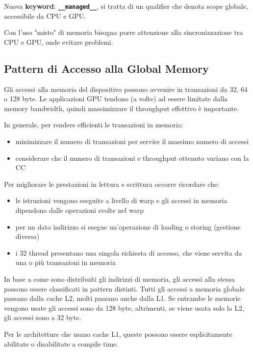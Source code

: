 Nuova \textbf{keyword}: \textbf{\texttt{\_\_managed\_\_}}, si tratta di un qualifier che denota scope globale, accessibile da CPU e GPU.

Con l'uso "misto" di memoria bisogna porre attenzione alla sincronizzazione tra CPU e GPU, onde evitare problemi.

\subsection{Pattern di Accesso alla Global Memory}

Gli accessi alla memoria del dispositivo possono avvenire in transazioni da 32, 64 o 128 byte. Le applicazioni GPU tendono (a volte) ad essere limitate dalla memory bandwidth, quindi massimizzare il throughput effettivo è importante. 

In generale, per rendere efficienti le transazioni in memoria:
\begin{itemize}
	\item minimizzare il numero di transazioni per servire il massimo numero di accessi
    
	\item considerare che il numero di transazioni e throughput ottenuto variano con la CC
\end{itemize}

Per migliorare le prestazioni in lettura e scrittura occorre ricordare che: 
\begin{itemize}
	\item le istruzioni vengono eseguite a livello di warp e gli accessi in memoria dipendono dalle operazioni svolte nel warp
    
	\item per un dato indirizzo si esegue un'operazione di loading o storing (gestione diversa)
	
    \item i 32 thread presentano una singola richiesta di accesso, che viene servita da una o più transazioni in memoria
\end{itemize}

In base a come sono distribuiti gli indirizzi di memoria, gli accessi alla stessa possono essere classificati in pattern distinti. Tutti gli accessi a memoria globale passano dalla cache L2, molti passano anche dalla L1. Se entrambe le memorie vengono usate gli accessi sono da 128 byte, altrimenti, se viene usata solo la L2, gli accessi sono a 32 byte.

Per le architetture che usano cache L1, queste possono essere esplicitamente abilitate o disabilitate a compile time.

